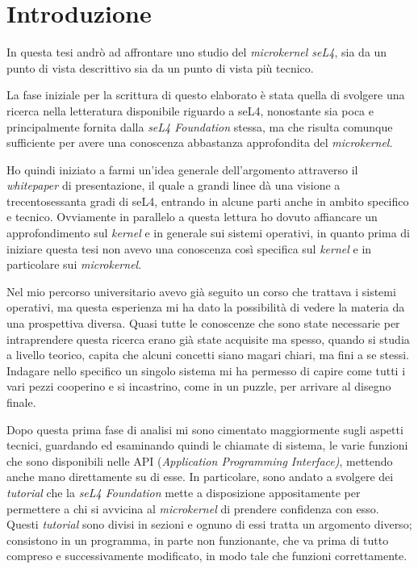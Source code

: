 \chapter{Introduzione}
In questa tesi andrò ad affrontare uno studio del \textit{microkernel seL4}, sia da un punto di vista descrittivo sia da un punto di vista più tecnico.

La fase iniziale per la scrittura di questo elaborato è stata quella di svolgere una ricerca nella letteratura disponibile riguardo a seL4, nonostante sia poca e principalmente fornita dalla \textit{seL4 Foundation} stessa, ma che risulta comunque sufficiente per avere una conoscenza abbastanza approfondita del \textit{microkernel}.

Ho quindi iniziato a farmi un'idea generale dell'argomento attraverso il \textit{whitepaper} \cite{sel4-whitepaper} di presentazione, il quale a grandi linee dà una visione a trecentosessanta gradi di seL4, entrando in alcune parti anche in ambito specifico e tecnico. Ovviamente in parallelo a questa lettura ho dovuto affiancare un approfondimento sul \textit{kernel} e in generale sui sistemi operativi, in quanto prima di iniziare questa tesi non avevo una conoscenza così specifica sul \textit{kernel} e in particolare sui \textit{microkernel}.

Nel mio percorso universitario avevo già seguito un corso che trattava i sistemi operativi, ma questa esperienza mi ha dato la possibilità di vedere la materia da una prospettiva diversa. Quasi tutte le conoscenze che sono state necessarie per intraprendere questa ricerca erano già state acquisite ma spesso, quando si studia a livello teorico, capita che alcuni concetti siano magari chiari, ma fini a se stessi. Indagare nello specifico un singolo sistema mi ha permesso di capire come tutti i vari pezzi cooperino e si incastrino, come in un puzzle, per arrivare al disegno finale.

Dopo questa prima fase di analisi mi sono cimentato maggiormente sugli aspetti tecnici, guardando ed esaminando quindi le chiamate di sistema, le varie funzioni che sono disponibili nelle API (\textit{Application Programming Interface)}, mettendo anche mano direttamente su di esse. In particolare, sono andato a svolgere dei \textit{tutorial} che la \textit{seL4 Foundation} mette a disposizione appositamente per permettere a chi si avvicina al \textit{microkernel} di prendere confidenza con esso. Questi \textit{tutorial} sono divisi in sezioni e ognuno di essi tratta un argomento diverso; consistono in un programma, in parte non funzionante, che va prima di tutto compreso e successivamente modificato, in modo tale che funzioni correttamente.

